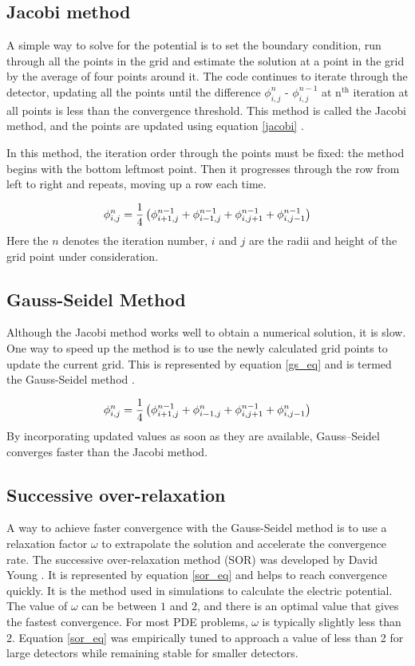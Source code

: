\subsection*{Jacobi method}
A simple way to solve for the potential is to set the boundary condition, run through all the points in the grid and estimate the solution at a point in the grid by the average of four points around it. The code continues to iterate through the detector, updating all the points until the difference $\phi_{i,j}^{n}$ - $\phi_{i,j}^{n-1}$ at n$^{\text{th}}$ iteration at all points is less than the convergence threshold. This method is called the Jacobi method, and the points are updated using equation \ref{jacobi} \cite{Varga2000}. 

In this method, the iteration order through the points must be fixed: the method begins with the bottom leftmost point. Then it progresses through the row from left to right and repeats, moving up a row each time.


\begin{equation}{\label{jacobi}}
 \phi_{i,j}^{n} = \frac{1}{4}  \left(\phi^{n-1}_{i+1,j} + \phi^{n-1}_{i-1,j} + \phi^{n-1}_{i,j+1} + \phi^{n-1}_{i,j-1} \right)
\end{equation}
Here the $n$ denotes the iteration number, $i$ and $j$ are the radii and height of the grid point under consideration. 

\subsection*{Gauss-Seidel Method}
Although the Jacobi method works well to obtain a numerical solution, it is slow. One way to speed up the method is to use the newly calculated grid points to update the current grid. This is represented by equation \ref{gs_eq} and is termed the Gauss-Seidel method \cite{Varga2000}.

\begin{equation}{\label{gs_eq}}
 \phi_{i,j}^{n} = \frac{1}{4}  \left(\phi^{n-1}_{i+1,j} + \phi^n_{i-1,j} + \phi^{n-1}_{i,j+1} + \phi^n_{i,j-1} \right)
\end{equation}
By incorporating updated values as soon as they are available, Gauss--Seidel converges faster than the Jacobi method.

\subsection*{Successive over-relaxation}
A way to achieve faster convergence with the Gauss-Seidel method is to use a relaxation factor $\omega$ to extrapolate the solution and accelerate the convergence rate. The successive over-relaxation method (SOR) was developed by David Young \cite{Young1950}. It is represented by equation \ref{sor_eq} and helps to reach convergence quickly. It is the method used in {\siggen} simulations to calculate the electric potential. The value of $\omega$ can be between $1$ and $2$, and there is an optimal value that gives the fastest convergence. For most PDE problems, $\omega$ is typically slightly less than 2. Equation \ref{sor_eq} was empirically tuned to approach a value of less than 2 for large detectors while remaining stable for smaller detectors.


